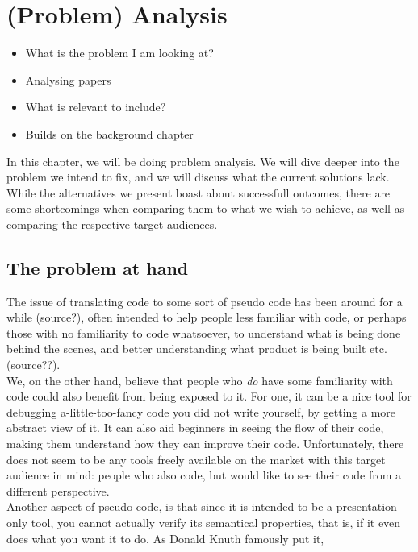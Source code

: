 \chapter{(Problem) Analysis}
\begin{itemize}
    \item What is the problem I am looking at?
    \item Analysing papers
    \item What is relevant to include?
    \item Builds on the background chapter
\end{itemize}

In this chapter, we will be doing problem analysis. We will dive deeper into the problem we intend to fix, and we will discuss what the current solutions lack. While the alternatives we present boast about successfull outcomes, there are some shortcomings when comparing them to what we wish to achieve, as well as comparing the respective target audiences. \hfill \\

\section{The problem at hand}

The issue of translating code to some sort of pseudo code has been around for a while (source?), often intended to help people less familiar with code, or perhaps those with no familiarity to code whatsoever, to understand what is being done behind the scenes, and better understanding what product is being built etc. (source??). \hfill \\

We, on the other hand, believe that people who \textit{do} have some familiarity with code could also benefit from being exposed to it. For one, it can be a nice tool for debugging a-little-too-fancy code you did not write yourself, by getting a more abstract view of it. It can also aid beginners in seeing the flow of their code, making them understand how they can improve their code. Unfortunately, there does not seem to be any tools freely available on the market with this target audience in mind: people who also code, but would like to see their code from a different perspective. \hfill \\

Another aspect of pseudo code, is that since it is intended to be a presentation-only tool, you cannot actually verify its semantical properties, that is, if it even does what you want it to do. As Donald Knuth famously put it,


